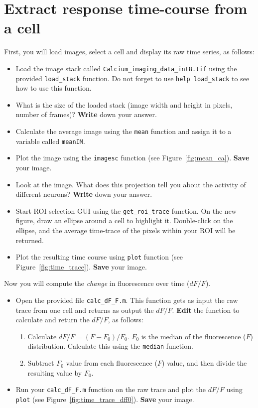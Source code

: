 \documentclass[paper=a4, fontsize=11pt]{scrartcl} %
\numberwithin{equation}{section} %
\numberwithin{figure}{section} %
\numberwithin{table}{section} %
\begin{document}
\section{Extract response time-course from a cell}

First, you will load images, select a cell and display its raw time series, as follows:

\begin{itemize}
\item Load the image stack called \texttt{Calcium\_imaging\_data\_int8.tif} using the provided \texttt{load\_stack} function.
  Do not forget to use \texttt{help load\_stack} to see how to use this function.
\item What is the size of the loaded stack (image width and height in pixels, number of frames)? \textbf{Write} down your answer.
  \vspace{1em}
\item Calculate the average image using the \texttt{mean} function and assign it to a variable called \texttt{meanIM}.
\item Plot the image using the \texttt{imagesc} function (see Figure~\ref{fig:mean_ca}). \textbf{Save} your image.
\item Look at the image. What does this projection tell you about the activity of different neurons? \textbf{Write} down your answer.
  \vspace{2em}
\item Start ROI selection GUI using the \texttt{get\_roi\_trace} function. On the new figure, draw an ellipse around a cell to highlight it. Double-click on the ellipse, and the average time-trace of the pixels within your ROI will be returned.
\item Plot the resulting time course using \texttt{plot} function (see Figure~\ref{fig:time_trace}). \textbf{Save} your image.
\end{itemize}

Now you will compute the \textit{change} in fluorescence over time ($dF/F$).
\begin{itemize}
\item Open the provided file \texttt{calc\_dF\_F.m}. This function gets as input the raw trace from one cell and returns as output the $dF/F$. \textbf{Edit} the function to calculate and return the $dF/F$, as follows:
  \begin{enumerate}
  \item Calculate $dF/F = (F-F_0)/F_0$. $F_0$ is the median of the fluorescence ($F$) distribution. Calculate this using the \texttt{median} function.
  \item Subtract $F_0$ value from each fluorescence ($F$) value, and then divide the resulting value by $F_0$.
  \end{enumerate}
\item Run your \texttt{calc\_dF\_F.m} function on the raw trace and plot the $dF/F$ using \texttt{plot} (see Figure~\ref{fig:time_trace_dff0}). \textbf{Save} your image.
\end{itemize}
\end{document}
